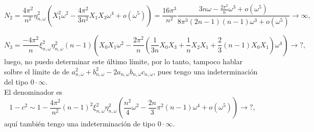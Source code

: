 \[
N_{2} = \frac{4 \pi^{2}}{n^{2}} \eta_{n, \omega}^{2}
\left(
X_{1}^{2} \omega^{2} - \frac{4 \pi^{2}}{3n^{2}}X_{1}X_{3} \omega^{4}
+ o(\omega^{5})
\right)
=
\frac{16 \pi^{3}}{n^{2}}
\frac{3n \omega - \frac{2 \pi^{2}}{n} \omega^{3} + o(\omega^{5})}{
8 \pi^{3}(2n-1)(n-1) \omega^{3} + o(\omega^{5})
}
\rightarrow \infty,
\]

\[
N_{3} =
\frac{-4 \pi^{2}}{n}
\xi_{n, \omega}^{2} \eta_{n, \omega}^{2}(n-1)
\left(
X_{0}X_{1}\omega^{2} 
- \frac{2 \pi^{2}}{n}
\left(
\frac{1}{3n} X_{0}X_{3} + \frac{1}{n} X_{2}X_{1}
+ \frac{2}{3}(n-1)X_{0}X_{1}
\right) \omega^{4}
\right)
\rightarrow ?,
\]
luego, no puedo determinar este último límite, por lo tanto,
tampoco hablar solbre el límite de
de $a_{n, \omega}^{2} + b_{n, \omega}^{2} - 
2a_{n, \omega}b_{n, \omega}c_{n, \omega}$, pues
tengo una indeterminación del tipo 
$0 \cdot \infty$. \\

El denominador es
\[
1-c^{2} \sim
1 - \frac{4\pi^{2}}{n^{2}}(n-1)^{2} \xi_{n, \omega}^{2} \eta_{n, \omega}^{2}
\left(
\frac{n^{2}}{4} \omega^{2} - \frac{2n}{3} \pi^{2} (n-1) \omega^{4} + o(\omega^{5})
\right) \rightarrow ?,
\]
aquí también tengo una indeterminación de tipo
$0 \cdot \infty$.